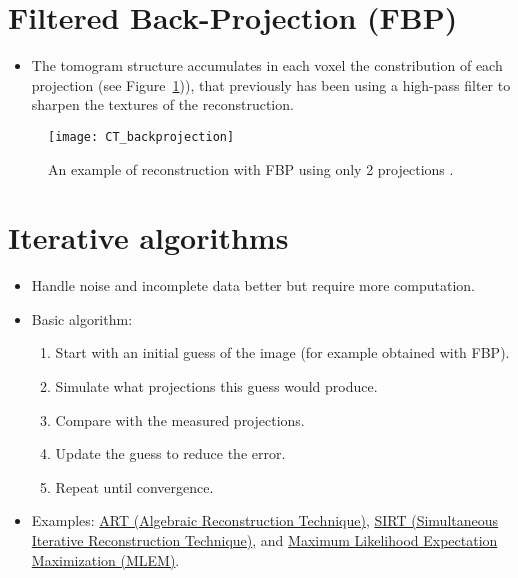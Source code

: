 \section{Filtered Back-Projection (FBP)}
\begin{itemize}
\item The tomogram structure accumulates in each voxel the
  constribution of each projection \cite{abdulla2025acquiring2} (see
  Figure~\ref{fig:CT_reconstruction})), that previously has been
   using a high-pass
  filter to sharpen the textures of the reconstruction.
\end{itemize}

\label{sec:FBP_example}
\vspace{-0ex}
\begin{figure}[H]
  \centering
  \texttt{[image: CT\_backprojection]}
  \caption{An example of reconstruction with FBP using only 2
    projections
    \cite{abdulla2025acquiring2}.\label{fig:CT_reconstruction}}
\end{figure}

\section{Iterative algorithms}
\begin{itemize}
\item Handle noise and incomplete data better but require more computation.
\item Basic algorithm:
  \begin{enumerate}
  \item Start with an initial guess of the image (for example obtained with FBP).
  \item Simulate what projections this guess would produce.
  \item Compare with the measured projections.
  \item Update the guess to reduce the error.
  \item Repeat until convergence.
  \end{enumerate}
\item Examples:
  \href{https://en.wikipedia.org/wiki/Algebraic_reconstruction_technique}{ART
    (Algebraic Reconstruction Technique)},
  \href{https://tomroelandts.com/articles/the-sirt-algorithm}{SIRT
    (Simultaneous Iterative Reconstruction Technique)}, and
  \href{https://arxiv.org/pdf/1504.06889}{Maximum Likelihood
    Expectation Maximization (MLEM)}.
\end{itemize}

